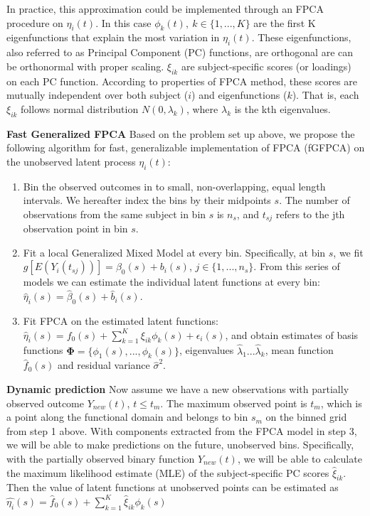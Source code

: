 \documentclass[
  11pt,
]{article}
\begin{document}
In practice, this approximation could be implemented through an FPCA
procedure on \(\eta_i(t)\). In this case
\(\phi_{k}(t),\ k \in \{1,...,K\}\) are the first K eigenfunctions that
explain the most variation in \(\eta_i(t)\). These eigenfunctions, also
referred to as Principal Component (PC) functions, are orthogonal are
can be orthonormal with proper scaling. \(\xi_{ik}\) are
subject-specific scores (or loadings) on each PC function. According to
properties of FPCA method, these scores are mutually independent over
both subject (\(i\)) and eigenfunctions (\(k\)). That is, each
\(\xi_{ik}\) follows normal distribution \(N(0, \lambda_k)\), where
\(\lambda_k\) is the kth eigenvalues.

\textbf{Fast Generalized FPCA} Based on the problem set up above, we
propose the following algorithm for fast, generalizable implementation
of FPCA (fGFPCA) on the unobserved latent process \(\eta_i(t)\):

\begin{enumerate}
\def\labelenumi{\arabic{enumi}.}
\item
  Bin the observed outcomes in to small, non-overlapping, equal length
  intervals. We hereafter index the bins by their midpoints \(s\). The
  number of observations from the same subject in bin \(s\) is \(n_s\),
  and \(t_{sj}\) refers to the jth observation point in bin \(s\).
\item
  Fit a local Generalized Mixed Model at every bin. Specifically, at bin
  \(s\), we fit \(g[E(Y_i(t_{sj}))] = \beta_0(s)+b_i(s)\),
  \(j\in\{1, ..., n_s\}\). From this series of models we can estimate
  the individual latent functions at every bin:
  \(\hat{\eta}_i(s) = \hat{\beta}_0(s)+\hat{b}_i(s)\).
\item
  Fit FPCA on the estimated latent functions:
  \(\hat{\eta}_i(s) = f_0(s)+\sum_{k=1}^K\xi_{ik}\phi_{k}(s)+\epsilon_i(s)\),
  and obtain estimates of basis functions
  \(\boldsymbol{\Phi} = \{\phi_1(s), ...,\phi_k(s)\}\), eigenvalues
  \(\hat{\lambda}_1...\hat{\lambda}_k\), mean function \(\hat{f}_0(s)\)
  and residual variance \(\hat{\sigma}^2\).
\end{enumerate}

\textbf{Dynamic prediction} Now assume we have a new observations with
partially observed outcome \(Y_{new}(t)\), \(t\leq t_m\). The maximum
observed point is \(t_m\), which is a point along the functional domain
and belongs to bin \(s_m\) on the binned grid from step 1 above. With
components extracted from the FPCA model in step 3, we will be able to
make predictions on the future, unobserved bins. Specifically, with the
partially observed binary function \(Y_{new}(t)\), we will be able to
calculate the maximum likelihood estimate (MLE) of the subject-specific
PC scores \(\hat{\xi}_{ik}\). Then the value of latent functions at
unobserved points can be estimated as
\(\hat{\eta_i}(s)=\hat{f}_0(s)+\sum_{k=1}^K\hat{\xi}_{ik}{\phi}_k(s)\)
\end{document}
